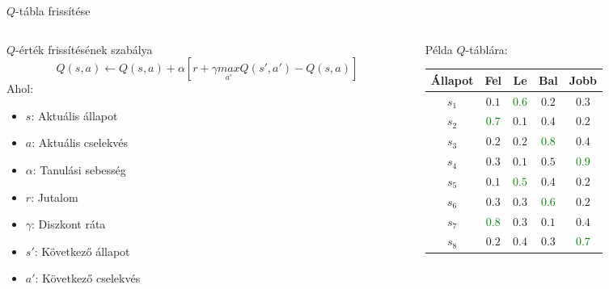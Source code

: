 \documentclass[english, aspectratio=169]{beamer}
\begin{document}
\begin{frame}{$Q$-tábla frissítése}
\begin{columns}
\begin{column}{.65\textwidth}
\begin{block}{$Q$-érték frissítésének szabálya}
\[
Q\left( s,a \right) \leftarrow Q\left( s,a \right) + \alpha \left[ r + \gamma \underset{a'}{max}Q\left( s',a' \right) - Q\left( s,a \right) \right]
\]
Ahol:
\begin{itemize}
	\item $s$: Aktuális állapot
	\item $a$: Aktuális cselekvés
	\item $\alpha$: Tanulási sebesség
	\item $r$: Jutalom 
	\item $\gamma$: Diszkont ráta
	\item $s'$: Következő állapot
	\item $a'$: Következő cselekvés
\end{itemize}
\end{block}
\end{column}
\begin{column}{.35\textwidth}
\begin{footnotesize}
\begin{table}[h]
\centering
Példa $Q$-táblára:\par\medskip
\begin{tabular}{|c||c|c|c|c|}\hline
Állapot & Fel & Le & Bal & Jobb \\\hline
$ s_1 $ & $0.1$ & \textcolor{green}{$0.6$} & $0.2$ & $0.3$ \\\hline
$ s_2 $ & \textcolor{green}{$0.7$} & $0.1$ & $0.4$ & $0.2$ \\\hline
$ s_3 $ & $0.2$ & $0.2$ & \textcolor{green}{$0.8$} & $0.4$ \\\hline
$ s_4 $ & $0.3$ & $0.1$ & $0.5$ & \textcolor{green}{$0.9$} \\\hline
$ s_5 $ & $0.1$ & \textcolor{green}{$0.5$} & $0.4$ & $0.2$ \\\hline
$ s_6 $ & $0.3$ & $0.3$ & \textcolor{green}{$0.6$} & $0.2$ \\\hline
$ s_7 $ & \textcolor{green}{$0.8$} & $0.3$ & $0.1$ & $0.4$ \\\hline
$ s_8 $ & $0.2$ & $0.4$ & $0.3$ & \textcolor{green}{$0.7$} \\\hline
\end{tabular}
\end{table}
\end{footnotesize}
\end{column}
\end{columns}
\end{frame}
\end{document}
